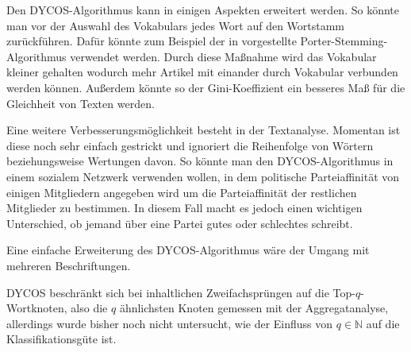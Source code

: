 Den DYCOS-Algorithmus kann in einigen Aspekten erweitert werden. So könnte man
vor der Auswahl des Vokabulars jedes Wort auf den Wortstamm zurückführen. Dafür
könnte zum Beispiel der in \cite{porter} vorgestellte Porter-Stemming-Algorithmus verwendet werden. Durch diese Maßnahme wird das Vokabular kleiner
gehalten wodurch mehr Artikel mit einander durch Vokabular verbunden werden
können. Außerdem könnte so der Gini-Koeffizient ein besseres Maß für die
Gleichheit von Texten werden.

Eine weitere Verbesserungsmöglichkeit besteht in der Textanalyse. Momentan ist
diese noch sehr einfach gestrickt und ignoriert die Reihenfolge von Wörtern
beziehungsweise Wertungen davon. So könnte man den DYCOS-Algorithmus in einem
sozialem Netzwerk verwenden wollen, in dem politische Parteiaffinität von
einigen Mitgliedern angegeben wird um die Parteiaffinität der restlichen
Mitglieder zu bestimmen. In diesem Fall macht es jedoch einen wichtigen
Unterschied, ob jemand über eine Partei gutes oder schlechtes schreibt.

Eine einfache Erweiterung des DYCOS-Algorithmus wäre der Umgang mit mehreren
Beschriftungen.

DYCOS beschränkt sich bei inhaltlichen Zweifachsprüngen auf die
Top-$q$-Wortknoten, also die $q$ ähnlichsten Knoten gemessen mit der
Aggregatanalyse, allerdings wurde bisher noch nicht untersucht, wie der
Einfluss von $q \in \mathbb{N}$ auf die Klassifikationsgüte ist.

